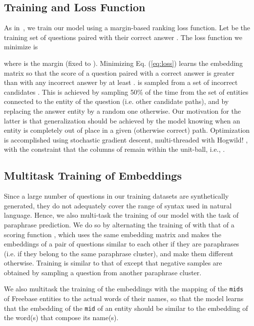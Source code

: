 \documentclass[runningheads,a4paper]{llncs}
\newcommand{\fb}{{\sc Freebase}\xspace}
\newcommand{\ent}[1]{{\small {\tt #1}}}
\begin{document}
\subsection{Training and Loss Function}
As in~\cite{wsabie}, we train our model using a margin-based
ranking loss function.  Let  be the training set of 
questions  paired with their correct answer . The loss
function we minimize is

where  is the margin (fixed to ).  Minimizing
Eq. (\ref{eq:loss}) learns the embedding matrix  so that the score
of a question paired with a correct answer is greater than with any
incorrect answer  by at least . 
 is sampled from a set of incorrect candidates .  
This is achieved by sampling 50\% of the
time from the set of entities connected to the entity of the question
(i.e. other candidate paths), and by replacing the
answer entity by a random one otherwise.
 Our motivation for the latter is that generalization should be
achieved by the model knowing when an entity is completely out of
place in a given (otherwise correct) path.  \fi
Optimization is accomplished using stochastic gradient descent,
multi-threaded with Hogwild!  \cite{recht2011hogwild}, with the 
constraint that the columns  of  remain within the unit-ball, 
i.e., .


\subsection{Multitask Training of Embeddings}
Since a large number of questions in our training datasets are
synthetically generated, they do not adequately
cover the range of syntax used in natural language.
Hence, we also multi-task the training of our model 
with the task of paraphrase prediction. 
We do so by alternating the training of  with that of a scoring
function , which uses the same
embedding matrix  and makes the embeddings of a pair of questions
 similar to each other if they are paraphrases (i.e. if
they belong to the same paraphrase cluster), and make them different
otherwise. 
Training  is similar to that of  except that negative samples are 
obtained by sampling a question from another paraphrase cluster.



We also multitask the training of the embeddings with the
mapping of the \ent{mids} of \fb entities to the actual words of their
names, so that the model learns that the embedding
of the \ent{mid} of an entity should be similar to the embedding of the
word(s) that compose its name(s).
\end{document}
